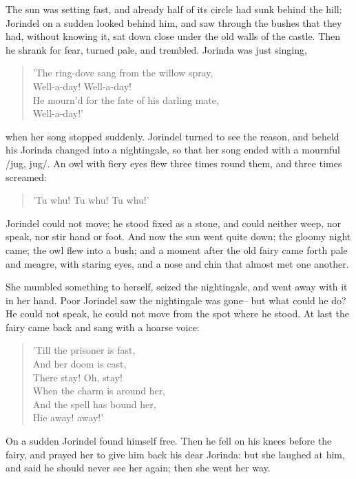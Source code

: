 \documentclass[12pt]{book}
\begin{document}
The sun was setting fast, and already half of its circle had sunk
behind the hill: Jorindel on a sudden looked behind him, and saw
through the bushes that they had, without knowing it, sat down close
under the old walls of the castle. Then he shrank for fear, turned
pale, and trembled. Jorinda was just singing,

\begin{verse}
 'The ring-dove sang from the willow spray,\\
  Well-a-day! Well-a-day!\\
  He mourn'd for the fate of his darling mate,\\
  Well-a-day!'
\end{verse}

when her song stopped suddenly. Jorindel turned to see the reason, and
beheld his Jorinda changed into a nightingale, so that her song ended
with a mournful /jug, jug/. An owl with fiery eyes flew three times
round them, and three times screamed:

\begin{verse}
 'Tu whu! Tu whu! Tu whu!'
\end{verse}

Jorindel could not move; he stood fixed as a stone, and could neither
weep, nor speak, nor stir hand or foot. And now the sun went quite
down; the gloomy night came; the owl flew into a bush; and a moment
after the old fairy came forth pale and meagre, with staring eyes, and
a nose and chin that almost met one another.

She mumbled something to herself, seized the nightingale, and went
away with it in her hand. Poor Jorindel saw the nightingale was gone--
but what could he do? He could not speak, he could not move from the
spot where he stood. At last the fairy came back and sang with a
hoarse voice:

\begin{verse}
 'Till the prisoner is fast,\\
  And her doom is cast,\\
  There stay! Oh, stay!\\
  When the charm is around her,\\
  And the spell has bound her,\\
  Hie away! away!'
\end{verse}

On a sudden Jorindel found himself free. Then he fell on his knees
before the fairy, and prayed her to give him back his dear Jorinda:
but she laughed at him, and said he should never see her again; then
she went her way.
\end{document}
